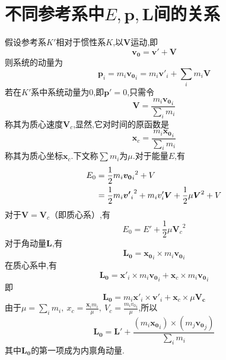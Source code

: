 \section{不同参考系中$E,\boldsymbol{p},\boldsymbol{L}$间的关系}
假设参考系$K'$相对于惯性系$K$,以$\boldsymbol{V}$运动,即
\begin{equation}
\boldsymbol{v_0} = \boldsymbol{v'} + \boldsymbol{V}
\end{equation}
则系统的动量为
\begin{equation}
\boldsymbol{p}_i = m_i \boldsymbol{v_0}_i = m_i\boldsymbol{v'}_i + \sum_{i}m_i\boldsymbol{V}
\end{equation}
若在$K'$系中系统动量为0,即$\boldsymbol{p'}=0$,只需令
\begin{equation}
\boldsymbol{V} = \frac{m_i\boldsymbol{v_0}_i}{\sum_{i}m_i}
\end{equation}
称其为质心速度$\boldsymbol{V}_c$,显然,它对时间的原函数是
\begin{equation}
\boldsymbol{x}_c = \frac{m_i\boldsymbol{x_0}_i}{\sum_{i}m_i}
\end{equation}
称其为质心坐标$\boldsymbol{x}_c$.下文称$\sum m_i$为$\mu$.对于能量$E$,有
\begin{align}
E_0 = {} & \frac{1}{2}m_i{\boldsymbol{v_0}_i}^2 + V \notag \\
= {} & \frac{1}{2}m_i{\boldsymbol{v'}_i}^2 + m_i v'_i \boldsymbol{V} + \frac{1}{2}\mu\boldsymbol{V}^2 + V
\end{align}
对于$\boldsymbol{V} = \boldsymbol{V}_c$（即质心系）,有
\begin{equation}
E_0 = E' + \frac{1}{2}\mu{\boldsymbol{V}_c}^2
\end{equation}
对于角动量$\boldsymbol{L}$,有
\begin{equation}
\boldsymbol{L_0} = \boldsymbol{x_0}_i \times m_i \boldsymbol{v_0}_i
\end{equation}
在质心系中,有
\begin{equation}
\boldsymbol{L_0} = \boldsymbol{x'}_i \times m_i \boldsymbol{v_0}_i + \boldsymbol{x}_c \times m_i \boldsymbol{v_0}_i
\end{equation}
即
\begin{equation}
\boldsymbol{L_0} = m_i\boldsymbol{x'}_i \times \boldsymbol{v'}_i + \boldsymbol{x}_c \times \mu\boldsymbol{V_c}
\end{equation}
由于$\mu=\sum_{i}m_i,\ x_c=\frac{\boldsymbol{x}_i m_i}{\mu},\ V_c=\frac{m_i {v_0}_i}{\mu}$,所以
\begin{equation}
\boldsymbol{L_0} = \boldsymbol{L}' + \frac{(m_i \boldsymbol{x_0}_i)\times (m_j \boldsymbol{v_0}_j)}{\sum_{i}m_i}
\end{equation}
其中$\boldsymbol{L_0}$的第一项成为内禀角动量.


